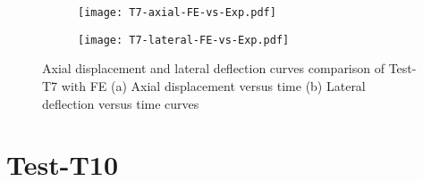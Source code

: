 \begin{figure}[!htbp]
	\centering
	\begin{subfigure}[b]{0.45\textwidth}
		\centering
		\texttt{[image: T7-axial-FE-vs-Exp.pdf]}
		\caption{}
		\label{subfig:T7-axial-FE-vs-Exp}
	\end{subfigure}
	\begin{subfigure}[b]{0.45\textwidth}
		\centering
		\texttt{[image: T7-lateral-FE-vs-Exp.pdf]}
		\caption{}
		\label{subfig:T7-lateral-FE-vs-Exp}
	\end{subfigure}
	   \caption{Axial displacement and lateral deflection curves comparison of Test-T7 with FE (a) Axial displacement versus time (b) Lateral deflection versus time curves}
	   \label{fig:T7-structural-FE-vs-Exp}
\end{figure} 

\section*{Test-T10}

